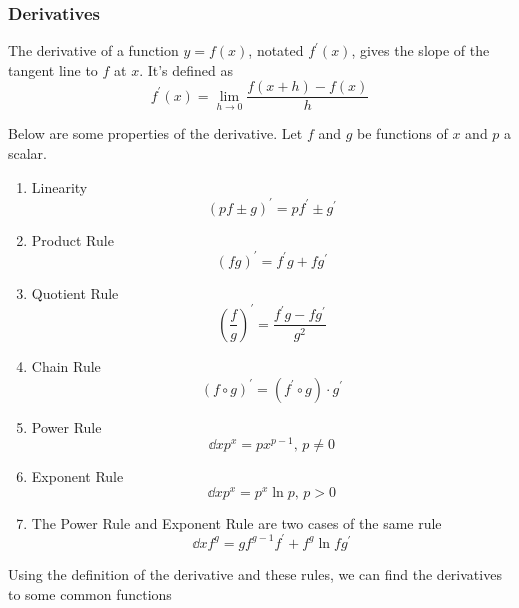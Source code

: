 \subsubsection{Derivatives}
The derivative of a function $y = f(x)$, notated $f^\prime(x)$, gives the slope of the tangent line to $f$ at $x$. It's defined as
\begin{equation*}
f^\prime(x) = \lim\limits_{h \to 0}{\frac{f(x+h) - f(x)}{h}}
\end{equation*}

\noindent
Below are some properties of the derivative. Let $f$ and $g$ be functions of $x$ and $p$ a scalar.
\begin{enumerate}[label=]
	\item Linearity
	\begin{equation*}
	\left( pf \pm g \right)^\prime = pf^\prime \pm g^\prime
	\end{equation*}
	\item Product Rule
	\begin{equation*}
	\left( fg \right)^\prime = f^\prime g + f g^\prime
	\end{equation*}
	\item Quotient Rule
	\begin{equation*}
	\left( \frac{f}{g} \right)^\prime = \frac{f^\prime g - f g^\prime}{g^2}
	\end{equation*}
	\item Chain Rule
	\begin{equation*}
	\left( f \circ g \right)^\prime = \left( f^\prime \circ g \right) \cdot g^\prime
	\end{equation*}
	\item Power Rule
	\begin{equation*}
	\dd{x} p^x = px^{p-1} \text{, } p \neq 0
	\end{equation*}
	\item Exponent Rule
	\begin{equation*}
	\dd{x} p^x = p^x \ln{p} \text{, } p > 0
	\end{equation*}
	\item The Power Rule and Exponent Rule are two cases of the same rule
	\begin{equation*}
	\dd{x} f^g = gf^{g-1}f^\prime + f^g\ln{f}g^\prime
	\end{equation*}
\end{enumerate}
Using the definition of the derivative and these rules, we can find the derivatives to some common functions
